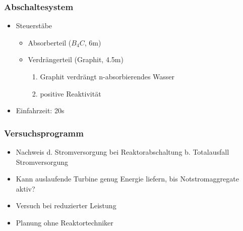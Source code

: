 \documentclass[12pt]{article}
\begin{document}
\subsubsection{Abschaltesystem}
\begin{itemize}[noitemsep]
	\item Steuerstäbe
		\begin{itemize}[noitemsep]
			\item Absorberteil (\(B_4C\), 6m)
			\item Verdrängerteil (Graphit, 4.5m)
				\begin{enumerate}[label = \textrightarrow]
					\item Graphit verdrängt n-absorbierendes Wasser
					\item positive Reaktivität
				\end{enumerate}
		\end{itemize}
	\item Einfahrzeit: 20s
\end{itemize}

\subsubsection{Versuchsprogramm}
\begin{itemize}[noitemsep]
	\item Nachweis d. Stromversorgung bei Reaktorabschaltung b. Totalausfall Stromversorgung
	\item Kann auslaufende Turbine genug Energie liefern, bis Notstromaggregate aktiv?
	\item Versuch bei reduzierter Leistung
	\item Planung ohne Reaktortechniker
\end{itemize}
\end{document}
